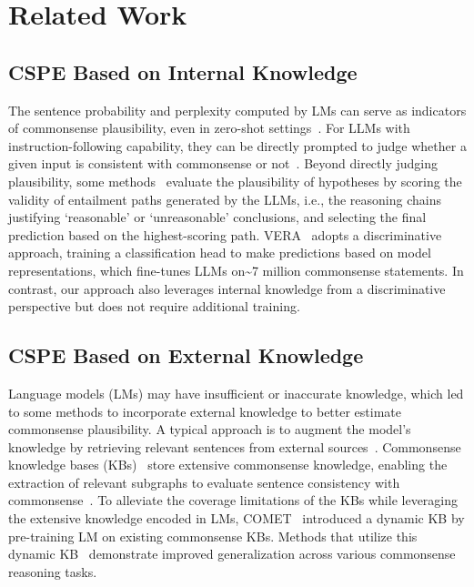 \section{Related Work}
\subsection{CSPE Based on Internal Knowledge}

The sentence probability and perplexity computed by LMs can serve as indicators of commonsense plausibility, even in zero-shot settings~\cite{Trinh2018ASM, Feldman2019CommonsenseKM, liu2021constrained}. For LLMs with instruction-following capability, they can be directly prompted to judge whether a given input is consistent with commonsense or not~\cite{zhao2024large}. Beyond directly judging plausibility, some methods~\cite{Jung2022MaieuticPL, Tafjord2022EntailerAQ} evaluate the plausibility of hypotheses by scoring the validity of entailment paths generated by the LLMs, i.e., the reasoning chains justifying `reasonable' or `unreasonable' conclusions, and selecting the final prediction based on the highest-scoring path. VERA~\cite{liu2023vera} adopts a discriminative approach, training a classification head to make predictions based on model representations, which fine-tunes LLMs on\textasciitilde7 million commonsense statements. In contrast, our approach also leverages internal knowledge from a discriminative perspective but does not require additional training.

\subsection{CSPE Based on External Knowledge}

Language models (LMs) may have insufficient or inaccurate knowledge, which led to some methods to incorporate external knowledge to better estimate commonsense plausibility. A typical approach is to augment the model's knowledge by retrieving relevant sentences from external sources~\cite{Zhang2021AlleviatingTK, Yu2022RetrievalAF}. Commonsense knowledge bases (KBs)~\cite{Speer2016ConceptNet5A, sap2019atomic, Hwang2020COMETATOMIC2O} store extensive commonsense knowledge, enabling the extraction of relevant subgraphs to evaluate sentence consistency with commonsense~\cite{Choi2022ALBERTWK}. To alleviate the coverage limitations of the KBs while leveraging the extensive knowledge encoded in LMs, COMET~\cite{Bosselut2019COMETCT} introduced a dynamic KB by pre-training LM on existing commonsense KBs. Methods that utilize this dynamic KB~\cite{Ghazarian2023ACCENTAA, Tian2023BOOSTHB} demonstrate improved generalization across various commonsense reasoning tasks.